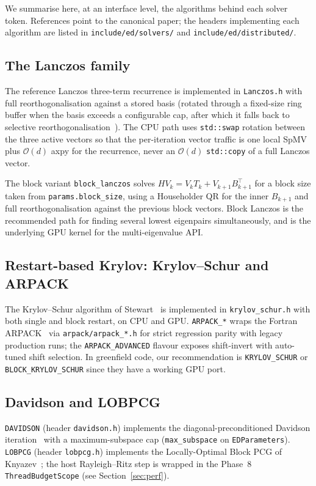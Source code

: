 \documentclass[submission, PhysCodeb]{SciPost}
\begin{document}
We summarise here, at an interface level, the algorithms behind each
solver token. References point to the canonical paper; the headers
implementing each algorithm are listed in
\texttt{include/ed/solvers/} and \texttt{include/ed/distributed/}.

\subsection{The Lanczos family}
\label{sec:methods-lanczos}

The reference Lanczos three-term recurrence \cite{Lanczos1950,Saad2011}
is implemented in \texttt{Lanczos.h} with full reorthogonalisation
against a stored basis (rotated through a fixed-size ring buffer when
the basis exceeds a configurable cap, after which it falls back to
selective reorthogonalisation~\cite{Paige1971}). The CPU path uses
\texttt{std::swap} rotation between the three active vectors so that
the per-iteration vector traffic is one local SpMV plus
$\mathcal{O}(d)$ axpy for the recurrence, never an
$\mathcal{O}(d)$ \texttt{std::copy} of a full Lanczos vector.

The block variant \texttt{block\_lanczos} solves $H V_k = V_k T_k +
V_{k+1} B_{k+1}^\top$ for a block size taken from
\texttt{params.block\_size}, using a Householder QR for the inner
$B_{k+1}$ and full reorthogonalisation against the previous block
vectors. Block Lanczos is the recommended path for finding
several lowest eigenpairs simultaneously, and is the underlying GPU
kernel for the multi-eigenvalue API.

\subsection{Restart-based Krylov: Krylov--Schur and ARPACK}
The Krylov--Schur algorithm of Stewart~\cite{Stewart2002} is
implemented in \texttt{krylov\_schur.h} with both single and block
restart, on CPU and GPU. \texttt{ARPACK\_*} wraps the Fortran
ARPACK~\cite{Lehoucq1998ARPACK} via \texttt{arpack/arpack\_*.h} for
strict regression parity with legacy production runs; the
\texttt{ARPACK\_ADVANCED} flavour exposes shift-invert with auto-tuned
shift selection. In greenfield code, our recommendation is
\texttt{KRYLOV\_SCHUR} or \texttt{BLOCK\_KRYLOV\_SCHUR} since they
have a working GPU port.

\subsection{Davidson and LOBPCG}
\texttt{DAVIDSON} (header \texttt{davidson.h}) implements the
diagonal-preconditioned Davidson iteration~\cite{Davidson1975} with a
maximum-subspace cap (\texttt{max\_subspace} on
\texttt{EDParameters}). \texttt{LOBPCG} (header \texttt{lobpcg.h})
implements the Locally-Optimal Block PCG of
Knyazev~\cite{Knyazev2001LOBPCG}; the host Rayleigh--Ritz step is
wrapped in the Phase~8 \texttt{ThreadBudgetScope} (see
Section~\ref{sec:perf}).
\end{document}
